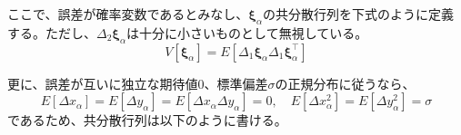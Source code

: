 \documentclass[12pt,a4j]{jsarticle}
\newcommand{\xa}{x_\alpha}
\newcommand{\ya}{y_\alpha}
\newcommand{\xia}{\bm{\xi}_\alpha}
\begin{document}
      ここで、誤差が確率変数であるとみなし、$\xia$の共分散行列を下式のように定義する。ただし、$\Delta_2\xia$は十分に小さいものとして無視している。
      \begin{equation}
        V[\xia] = E[\Delta_1\xia\Delta_1\xia^\top]
      \end{equation}

      更に、誤差が互いに独立な期待値$0$、標準偏差$\sigma$の正規分布に従うなら、
      \begin{equation}
        E[\Delta\xa] = E[\Delta\ya] = E[\Delta\xa\Delta\ya] = 0, \quad E[\Delta\xa^2] = E[\Delta\ya^2] = \sigma
      \end{equation}
      であるため、共分散行列は以下のように書ける。
\end{document}
